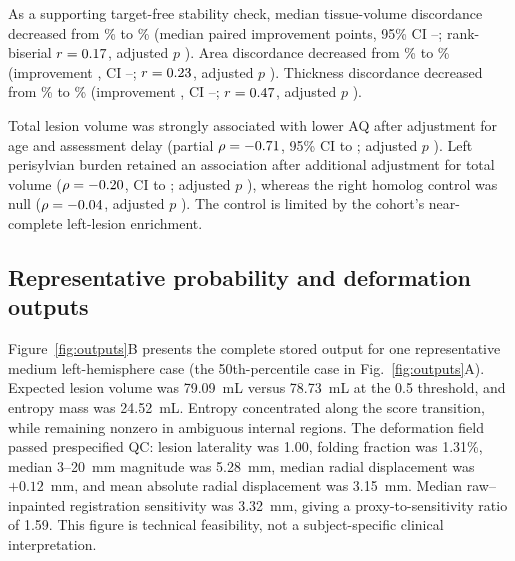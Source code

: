 \documentclass[runningheads]{llncs}
\begin{document}
As a supporting target-free stability check, median tissue-volume discordance
decreased from
\ArcSparedVolumeBeforeMedian\% to \ArcSparedVolumeAfterMedian\% (median paired
improvement \ArcSparedVolumeDeltaMedian{} points, 95\% CI
\ArcSparedVolumeDeltaCILow--\ArcSparedVolumeDeltaCIHigh; rank-biserial
$r=0.17$, adjusted $p$ \ArcSparedVolumeP). Area discordance
decreased from \ArcSparedAreaBeforeMedian\% to \ArcSparedAreaAfterMedian\%
(improvement \ArcSparedAreaDeltaMedian{}, CI
\ArcSparedAreaDeltaCILow--\ArcSparedAreaDeltaCIHigh; $r=0.23$,
adjusted $p$ \ArcSparedAreaP). Thickness discordance decreased from
\ArcSparedThicknessBeforeMedian\% to \ArcSparedThicknessAfterMedian\%
(improvement \ArcSparedThicknessDeltaMedian{}, CI
\ArcSparedThicknessDeltaCILow--\ArcSparedThicknessDeltaCIHigh;
$r=0.47$, adjusted $p$ \ArcSparedThicknessP).

Total lesion volume was strongly associated with lower AQ after adjustment for
age and assessment delay (partial $\rho=-0.71$, 95\% CI
\ArcClinicalVolumeCILow{} to \ArcClinicalVolumeCIHigh; adjusted $p$
\ArcClinicalVolumeP). Left perisylvian burden retained an association after
additional adjustment for total volume ($\rho=-0.20$, CI
\ArcClinicalLeftCILow{} to \ArcClinicalLeftCIHigh; adjusted $p$
\ArcClinicalLeftP), whereas the right homolog control was null
($\rho=-0.04$, adjusted $p$ \ArcClinicalRightP). The control is
limited by the cohort's near-complete left-lesion enrichment.

\subsection{Representative probability and deformation outputs}
Figure~\ref{fig:outputs}B presents the complete stored output for one
representative medium left-hemisphere case (the 50th-percentile case in
Fig.~\ref{fig:outputs}A). Expected lesion volume was
79.09~mL versus 78.73~mL at the 0.5 threshold, and entropy mass was 24.52~mL.
Entropy concentrated along the score transition, while remaining nonzero in
ambiguous internal regions. The deformation field passed prespecified QC:
lesion laterality was 1.00, folding fraction was 1.31\%, median 3--20~mm
magnitude was 5.28~mm, median radial displacement was $+0.12$~mm, and mean
absolute radial displacement was 3.15~mm. Median raw--inpainted registration
sensitivity was 3.32~mm, giving a proxy-to-sensitivity ratio of 1.59. This
figure is technical feasibility, not a subject-specific clinical interpretation.
\end{document}
